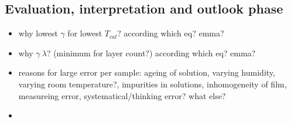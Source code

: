 \subsection{Evaluation, interpretation and outlook phase}
\label{sec:phase4}
\begin{itemize}
    \item why lowest $\gamma$ for lowest $T_{cal}$? according which eq? emma? 
    \item why $\gamma ~ \lambda$? (minimum for layer count?) according which eq? emma? 
    \item reasons for large error per sample: ageing of solution, varying humidity, varying room temperature?, impurities in solutions, inhomogeneity of film, measureing error, systematical/thinking error? what else? 
    \item {} 
\end{itemize}
\fi


